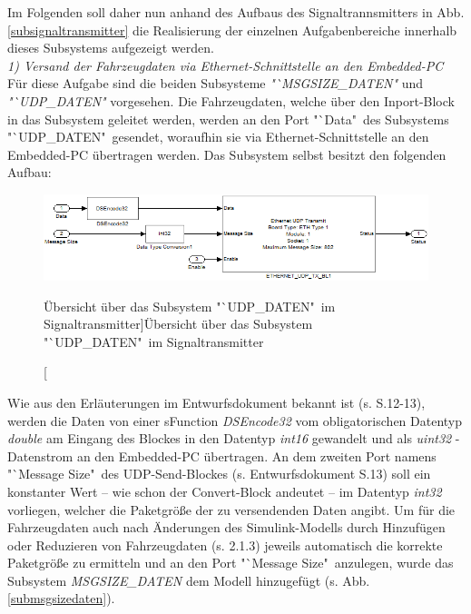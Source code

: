 \documentclass[fontsize = 12pt, paper = a4]{scrreprt}
\begin{document}
Im Folgenden soll daher nun anhand des Aufbaus des Signaltrannsmitters in Abb. \ref{subsignaltransmitter} die Realisierung der einzelnen Aufgabenbereiche innerhalb dieses Subsystems aufgezeigt werden. \\




\textit{1) Versand der Fahrzeugdaten via Ethernet-Schnittstelle an den Embedded-PC} \\

Für diese Aufgabe sind die beiden Subsysteme \textit{"`MSGSIZE\_DATEN"} und \textit{"`UDP\_DATEN"} vorgesehen. Die Fahrzeugdaten, welche über den Inport-Block in das Subsystem geleitet werden, werden an den Port "`Data"\ des Subsystems "`UDP\_DATEN"\ gesendet, woraufhin sie via Ethernet-Schnittstelle an den Embedded-PC übertragen werden. Das Subsystem selbst besitzt den folgenden Aufbau:

\begin{figure}[h]
\centering
\includegraphics[scale = 0.75]{subudpdaten}
\caption[Übersicht über das Subsystem "`UDP\_DATEN"\ im Signaltransmitter]{Übersicht über das Subsystem "`UDP\_DATEN"\ im Signaltransmitter}
\label{scdatenmotor}
\end{figure} 

Wie aus den Erläuterungen im Entwurfsdokument bekannt ist (s. S.12-13), werden die Daten von einer sFunction \textit{DSEncode32} vom obligatorischen Datentyp \textit{double} am Eingang des Blockes in den Datentyp \textit{int16} gewandelt und als \textit{uint32} - Datenstrom an den Embedded-PC übertragen. An dem zweiten Port namens "`Message Size"\ des UDP-Send-Blockes (s. Entwurfsdokument S.13) soll ein konstanter Wert -- wie schon der Convert-Block andeutet -- im Datentyp \textit{int32} vorliegen, welcher die Paketgröße der zu versendenden Daten angibt. Um für die Fahrzeugdaten auch nach Änderungen des Simulink-Modells durch Hinzufügen oder Reduzieren von Fahrzeugdaten (s. 2.1.3) jeweils automatisch die korrekte Paketgröße zu ermitteln und an den Port "`Message Size"\ anzulegen, wurde das Subsystem \textit{MSGSIZE\_DATEN} dem Modell hinzugefügt (s. Abb. \ref{submsgsizedaten}). 
\end{document}

